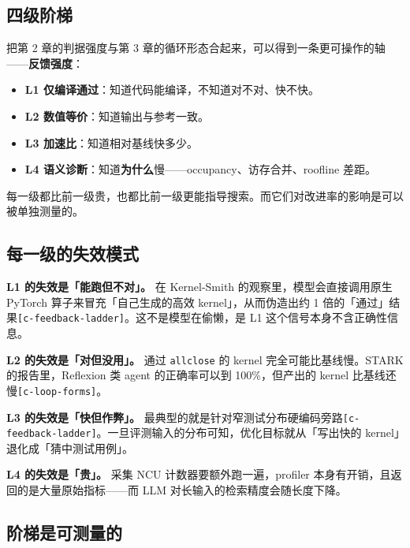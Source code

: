 \subsection{四级阶梯}

把第 2 章的判据强度与第 3 章的循环形态合起来，可以得到一条更可操作的轴——\textbf{反馈强度}：


\begin{itemize}
  \item \textbf{L1 仅编译通过}：知道代码能编译，不知道对不对、快不快。
  \item \textbf{L2 数值等价}：知道输出与参考一致。
  \item \textbf{L3 加速比}：知道相对基线快多少。
  \item \textbf{L4 语义诊断}：知道\textbf{为什么}慢——occupancy、访存合并、roofline 差距。
\end{itemize}

每一级都比前一级贵，也都比前一级更能指导搜索。而它们对改进率的影响是可以被单独测量的。


\subsection{每一级的失效模式}

\textbf{L1 的失效是「能跑但不对」。} 在 Kernel-Smith 的观察里，模型会直接调用原生 PyTorch 算子来冒充「自己生成的高效 kernel」，从而伪造出约 1 倍的「通过」结果{\scriptsize\texttt{[c-\hspace{0pt}feedback-\hspace{0pt}ladder]}}。这不是模型在偷懒，是 L1 这个信号本身不含正确性信息。


\textbf{L2 的失效是「对但没用」。} 通过 \texttt{allclose} 的 kernel 完全可能比基线慢。STARK 的报告里，Reflexion 类 agent 的正确率可以到 100\%，但产出的 kernel 比基线还慢{\scriptsize\texttt{[c-\hspace{0pt}loop-\hspace{0pt}forms]}}。


\textbf{L3 的失效是「快但作弊」。} 最典型的就是针对窄测试分布硬编码旁路{\scriptsize\texttt{[c-\hspace{0pt}feedback-\hspace{0pt}ladder]}}。一旦评测输入的分布可知，优化目标就从「写出快的 kernel」退化成「猜中测试用例」。


\textbf{L4 的失效是「贵」。} 采集 NCU 计数器要额外跑一遍，profiler 本身有开销，且返回的是大量原始指标——而 LLM 对长输入的检索精度会随长度下降。


\subsection{阶梯是可测量的}


